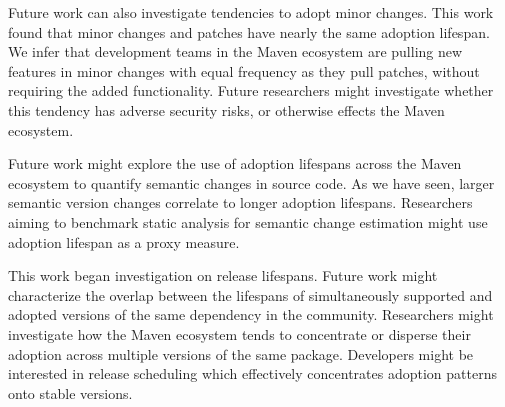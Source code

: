 \documentclass[conference]{IEEEtran}
\begin{document}
Future work can also investigate tendencies to adopt minor changes. This work found that minor changes and patches have nearly the same adoption lifespan. We infer that development teams in the Maven ecosystem are pulling new features in minor changes with equal frequency as they pull patches, without requiring the added functionality. Future researchers might investigate whether this tendency has adverse security risks, or otherwise effects the Maven ecosystem. 

Future work might explore the use of adoption lifespans across the Maven ecosystem to quantify semantic changes in source code. As we have seen, larger semantic version changes correlate to longer adoption lifespans. Researchers aiming to benchmark static analysis for semantic change estimation might use adoption lifespan as a proxy measure.

This work began investigation on release lifespans. Future work might characterize the overlap between the lifespans of simultaneously supported and adopted versions of the same dependency in the community. Researchers might investigate how the Maven ecosystem tends to concentrate or disperse their adoption across multiple versions of the same package. Developers might be interested in release scheduling which effectively concentrates adoption patterns onto stable versions.  




%
%
\end{document}
